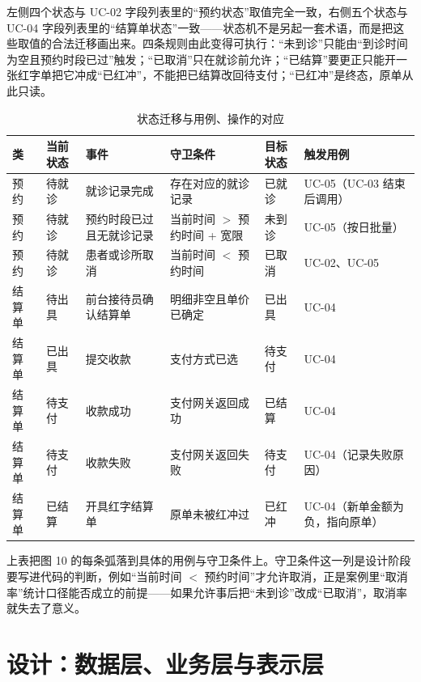 \documentclass[11pt,a4paper]{ctexart}
\newcommand{\figtag}[1]{%
  \tikz[baseline=-0.35ex]{\node[fill=adcblue!90,text=white,rounded corners=1.5pt,
    inner xsep=5pt,inner ysep=1.2pt,font=\scriptsize\bfseries]{#1};}\hspace{2pt}}
\begin{document}
\figtag{图 10 说明} 左侧四个状态与 UC-02 字段列表里的“预约状态”取值完全一致，右侧五个状态与 UC-04 字段列表里的“结算单状态”一致——状态机不是另起一套术语，而是把这些取值的合法迁移画出来。四条规则由此变得可执行：“未到诊”只能由“到诊时间为空且预约时段已过”触发；“已取消”只在就诊前允许；“已结算”要更正只能开一张红字单把它冲成“已红冲”，不能把已结算改回待支付；“已红冲”是终态，原单从此只读。

\begin{table}[H]
\centering
\caption{状态迁移与用例、操作的对应}
{\small
\begin{tabularx}{\linewidth}{@{}L{1.5cm}L{1.7cm}L{2.3cm}L{3.4cm}L{1.6cm}X@{}}
\toprule
\textbf{\textcolor{adcblue!92}{类}} & \textbf{\textcolor{adcblue!92}{当前状态}} & \textbf{\textcolor{adcblue!92}{事件}} & \textbf{\textcolor{adcblue!92}{守卫条件}} & \textbf{\textcolor{adcblue!92}{目标状态}} & \textbf{\textcolor{adcblue!92}{触发用例}} \\
\midrule
预约 & 待就诊 & 就诊记录完成 & 存在对应的就诊记录 & 已就诊 & UC-05（UC-03 结束后调用） \\
预约 & 待就诊 & 预约时段已过且无就诊记录 & 当前时间 $>$ 预约时间 + 宽限 & 未到诊 & UC-05（按日批量） \\
预约 & 待就诊 & 患者或诊所取消 & 当前时间 $<$ 预约时间 & 已取消 & UC-02、UC-05 \\
结算单 & 待出具 & 前台接待员确认结算单 & 明细非空且单价已确定 & 已出具 & UC-04 \\
结算单 & 已出具 & 提交收款 & 支付方式已选 & 待支付 & UC-04 \\
结算单 & 待支付 & 收款成功 & 支付网关返回成功 & 已结算 & UC-04 \\
结算单 & 待支付 & 收款失败 & 支付网关返回失败 & 待支付 & UC-04（记录失败原因） \\
结算单 & 已结算 & 开具红字结算单 & 原单未被红冲过 & 已红冲 & UC-04（新单金额为负，指向原单） \\
\bottomrule
\end{tabularx}
}
\end{table}

上表把图 10 的每条弧落到具体的用例与守卫条件上。守卫条件这一列是设计阶段要写进代码的判断，例如“当前时间 $<$ 预约时间”才允许取消，正是案例里“取消率”统计口径能否成立的前提——如果允许事后把“未到诊”改成“已取消”，取消率就失去了意义。

\section{设计：数据层、业务层与表示层}
\end{document}
